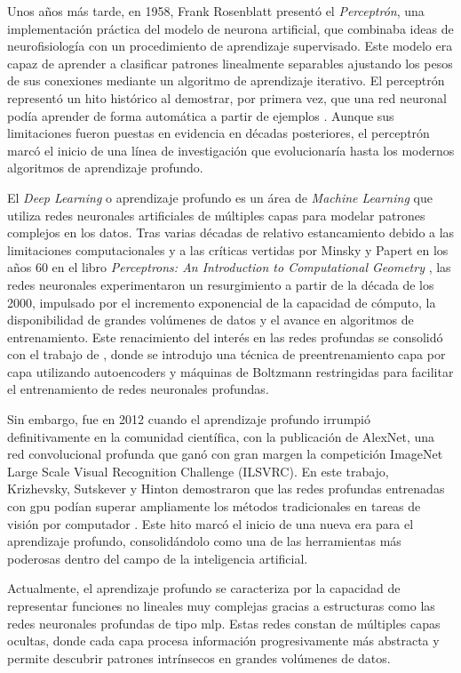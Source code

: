 Unos años más tarde, en 1958, Frank Rosenblatt presentó el \textit{Perceptrón}, una implementación práctica del modelo de neurona artificial, que combinaba ideas de neurofisiología con un procedimiento de aprendizaje supervisado. Este modelo era capaz de aprender a clasificar patrones linealmente separables ajustando los pesos de sus conexiones mediante un algoritmo de aprendizaje iterativo. El perceptrón representó un hito histórico al demostrar, por primera vez, que una red neuronal podía aprender de forma automática a partir de ejemplos \cite{rosenblatt1958perceptron}. Aunque sus limitaciones fueron puestas en evidencia en décadas posteriores, el perceptrón marcó el inicio de una línea de investigación que evolucionaría hasta los modernos algoritmos de aprendizaje profundo.


El \textit{Deep Learning} o aprendizaje profundo es un área de \textit{Machine Learning} que utiliza redes neuronales artificiales de múltiples capas para modelar patrones complejos en los datos. Tras varias décadas de relativo estancamiento debido a las limitaciones computacionales y a las críticas vertidas por Minsky y Papert en los años 60 en el libro \textit{Perceptrons: An Introduction to Computational Geometry} \cite{minsky1969perceptrons}, las redes neuronales experimentaron un resurgimiento a partir de la década de los 2000, impulsado por el incremento exponencial de la capacidad de cómputo, la disponibilidad de grandes volúmenes de datos y el avance en algoritmos de entrenamiento. Este renacimiento del interés en las redes profundas se consolidó con el trabajo de \cite{hinton2006reducing}, donde se introdujo una técnica de preentrenamiento capa por capa utilizando autoencoders y máquinas de Boltzmann restringidas para facilitar el entrenamiento de redes neuronales profundas.

Sin embargo, fue en 2012 cuando el aprendizaje profundo irrumpió definitivamente en la comunidad científica, con la publicación de AlexNet, una red convolucional profunda que ganó con gran margen la competición ImageNet Large Scale Visual Recognition Challenge (ILSVRC). En este trabajo, Krizhevsky, Sutskever y Hinton demostraron que las redes profundas entrenadas con \acrlong{gpu} podían superar ampliamente los métodos tradicionales en tareas de visión por computador \cite{krizhevsky2012imagenet}. Este hito marcó el inicio de una nueva era para el aprendizaje profundo, consolidándolo como una de las herramientas más poderosas dentro del campo de la inteligencia artificial.

Actualmente, el aprendizaje profundo se caracteriza por la capacidad de representar funciones no lineales muy complejas gracias a estructuras como las redes neuronales profundas de tipo \acrlong{mlp}. Estas redes constan de múltiples capas ocultas, donde cada capa procesa información progresivamente más abstracta y permite descubrir patrones intrínsecos en grandes volúmenes de datos.

